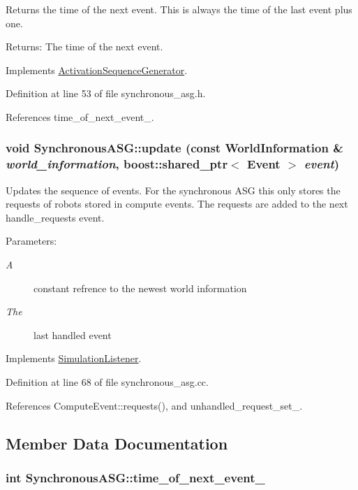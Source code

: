 Returns the time of the next event. This is always the time of the last event plus one. \begin{Desc}
\item[Returns:]The time of the next event. \end{Desc}


Implements \hyperlink{class_activation_sequence_generator_724cfa2e135813db7becb90af1783050}{ActivationSequenceGenerator}.

Definition at line 53 of file synchronous\_\-asg.h.

References time\_\-of\_\-next\_\-event\_\-.\hypertarget{class_synchronous_a_s_g_4b85489783f05e0061c701a1dac51773}{
\subsubsection[update]{\setlength{\rightskip}{0pt plus 5cm}void SynchronousASG::update (const {\bf WorldInformation} \& {\em world\_\-information}, \/  boost::shared\_\-ptr$<$ Event $>$ {\em event})}}
\label{class_synchronous_a_s_g_4b85489783f05e0061c701a1dac51773}


Updates the sequence of events. For the synchronous ASG this only stores the requests of robots stored in compute events. The requests are added to the next handle\_\-requests event. \begin{Desc}
\item[Parameters:]
\begin{description}
\item[{\em A}]constant refrence to the newest world information \item[{\em The}]last handled event \end{description}
\end{Desc}


Implements \hyperlink{class_simulation_listener_f1b53fbefce7830648bb059dfd0f18b4}{SimulationListener}.

Definition at line 68 of file synchronous\_\-asg.cc.

References ComputeEvent::requests(), and unhandled\_\-request\_\-set\_\-.

\subsection{Member Data Documentation}
\hypertarget{class_synchronous_a_s_g_abb2e0b562aea4bc197c54e4a9298918}{
\subsubsection[time\_\-of\_\-next\_\-event\_\-]{\setlength{\rightskip}{0pt plus 5cm}int {\bf SynchronousASG::time\_\-of\_\-next\_\-event\_\-}}}
\label{class_synchronous_a_s_g_abb2e0b562aea4bc197c54e4a9298918}


